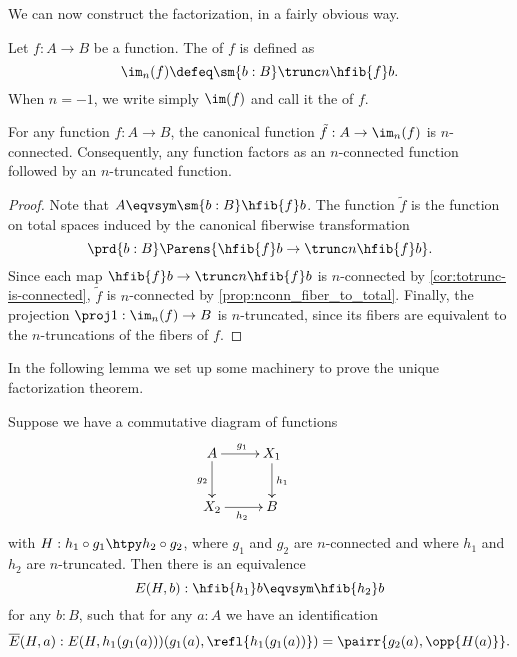 We can now construct the factorization, in a fairly obvious way.

\begin{defn}\label{defn:modal-image}
Let $f:A\to B$ be a function. The 
%
%
%
%
of $f$ is defined as
\begin{equation*}
\im_n(f)\defeq \sm{b:B} \trunc n{\hfib{f}b}.
\end{equation*}
When $n=-1$, we write simply $\im(f)$ and call it the  of $f$.
\end{defn}

\begin{lem}\label{prop:to_image_is_connected}
For any function $f:A\to B$, the canonical function $\tilde{f}:A\to\im_n(f)$ is $n$-connected.
Consequently, any function factors as an $n$-connected function followed by an $n$-truncated function.
\end{lem}

\begin{proof}
Note that $A\eqvsym\sm{b:B}\hfib{f}b$. The function $\tilde{f}$ is the function on total spaces induced by the canonical fiberwise transformation
\begin{equation*}
\prd{b:B} \Parens{\hfib{f}b\to\trunc n{\hfib{f}b}}.
\end{equation*}
Since each map $\hfib{f}b\to\trunc n{\hfib{f}b}$ is $n$-connected by \cref{cor:totrunc-is-connected}, $\tilde{f}$ is $n$-connected by \cref{prop:nconn_fiber_to_total}.
Finally, the projection $\proj1:\im_n(f) \to B$ is $n$-truncated, since its fibers are equivalent to the $n$-truncations of the fibers of $f$.
\end{proof}

In the following lemma we set up some machinery to prove the unique factorization theorem.

\begin{lem}\label{prop:factor_equiv_fiber}
Suppose we have a commutative diagram of functions
\begin{equation*}
  \xymatrix{
    {A} \ar[r]^{g_1} \ar[d]_{g_2} &
    {X_1} \ar[d]^{h_1} &
    \\
    {X_2} \ar[r]_{h_2}
    &
    {B}
  }
\end{equation*}
with $H:h_1\circ g_1\htpy h_2\circ g_2$, where $g_1$ and $g_2$ are $n$-connected and where $h_1$ and $h_2$ are $n$-truncated.
Then there is an equivalence
\begin{equation*}
E(H,b):\hfib{h_1}b\eqvsym\hfib{h_2}b
\end{equation*}
for any $b:B$, such that for any $a:A$ we have an identification
\[\overline{E}(H,a) :  E(H,h_1(g_1(a)))({g_1(a),\refl{h_1(g_1(a))}}) = \pairr{g_2(a),\opp{H(a)}}.\]
\end{lem}

